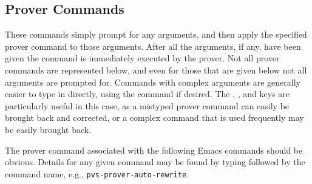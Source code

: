 \subsection{Prover Commands}

These commands simply prompt for any arguments, and then apply the
specified prover command to those arguments.  After all the arguments, if
any, have been given the command is immediately executed by the prover.
Not all prover commands are represented below, and even for those that are
given below not all arguments are prompted for.  Commands with complex
arguments are generally easier to type in directly, using the
 command if desired.  The ,
, and  keys are particularly useful in this case, as a
mistyped prover command can easily be brought back and corrected, or a
complex command that is used frequently may be easily brought back.

The prover command associated with the following Emacs commands should be
obvious.  Details for any given command may be found by typing 
followed by the command name, e.g., \texttt{pvs-prover-auto-rewrite}.

